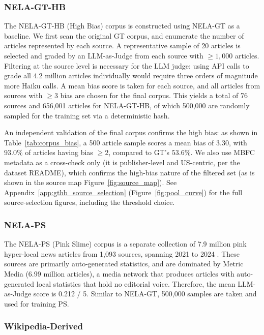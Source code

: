 \documentclass[11pt]{article}
\begin{document}
\subsubsection{NELA-GT-HB}
\label{subsec:gthb}

The NELA-GT-HB (High Bias) corpus is constructed using NELA-GT as a baseline.
We first scan the original GT corpus, and enumerate the number of articles represented by each source.
A representative sample of 20 articles is selected and graded by an LLM-as-Judge from each source with $\ge1{,}000$ articles.
Filtering at the source level is necessary for the LLM judge: using API calls to grade all 4.2 million articles individually would require three orders of magnitude more Haiku calls.
A mean bias score is taken for each source, and all articles from sources with $\ge3$ bias are chosen for the final corpus.
This yields a total of 76 sources and 656{,}001 articles for NELA-GT-HB, of which 500{,}000 are randomly sampled for the training set via a deterministic hash.

An independent validation of the final corpus confirms the high bias: as shown in Table~\ref{tab:corpus_bias}, a 500 article sample scores a mean bias of 3.30, with $93.0\%$ of articles having bias $\ge2$, compared to GT's $53.6\%$.
We also use MBFC metadata as a cross-check only (it is publisher-level and US-centric, per the dataset README), which confirms the high-bias nature of the filtered set (as is shown in the source map Figure~\ref{fig:source_map}).
See Appendix~\ref{app:gthb_source_selection} (Figure~\ref{fig:pool_curve}) for the full source-selection figures, including the threshold choice.

\subsubsection{NELA-PS}

The NELA-PS (Pink Slime) corpus is a separate collection of 7.9 million pink hyper-local news articles from 1{,}093 sources, spanning
2021 to 2024 \cite{horne2024nelaps}. These sources are primarily auto-generated statistics, and are dominated by Metric Media (6.99 million articles), a media 
network that produces articles with auto-generated local statistics that hold no editorial voice. 
Therefore, the mean LLM-as-Judge score is 0.212 / 5.
Similar to NELA-GT, 500{,}000 samples are taken and used for training PS. 

\subsubsection{Wikipedia-Derived}
\end{document}
